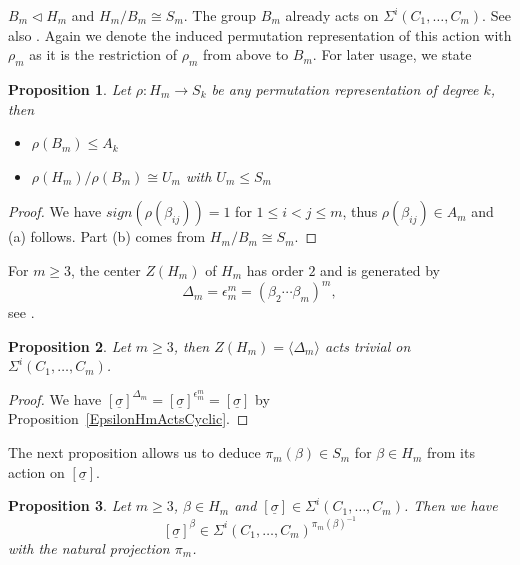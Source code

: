 \documentclass[12pt,a4paper]{article}
\newtheorem{proposition}{Proposition}[section]
\numberwithin{equation}{section}
\numberwithin{table}{section}
\begin{document}
$B_m \vartriangleleft H_m$ and $H_m/B_m \cong S_m$.
The group $B_m$ already acts on $\Sigma^i(C_1,\dots, C_m)$. See also \cite[III]{RefMM2018}.
Again we denote the induced permutation representation of this action with $\rho_m$ as
it is the restriction of $\rho_m$ from above to $B_m$.
For later usage, we state
%
\begin{proposition}
\label{PropertiesOfPermutationRepresentations}
Let $\rho : H_m \rightarrow S_k$ be any permutation representation of degree $k$, then
\begin{itemize}
\item[(a)]
$\rho(B_m) \leq A_k$
\item[(b)]
$\rho(H_m)/\rho(B_m) \cong U_m$ with $U_m \leq S_m$
\end{itemize}
\end{proposition}
\begin{proof}
We have $sign(\rho(\beta_{ij})) = 1$ for $1 \leq i < j \leq m$, thus $\rho(\beta_{ij}) \in A_m$ and (a) follows.
Part (b) comes from $H_m/B_m \cong S_m$.
\end{proof}
%
\noindent
For $m \geq 3$, the center $Z(H_m)$ of $H_m$ has order $2$ and is generated by 
$$\Delta_m = \epsilon_m^m = (\beta_2 \cdots \beta_m)^m,$$
see \cite[III, Corollary 1.8]{RefMM2018}.
%
\begin{proposition}
\label{CenterHmActsTrivial}
Let $m \geq 3$, then $Z(H_m) = \langle \Delta_m \rangle$ acts trivial on $\Sigma^i(C_1,\dots, C_m)$.
\end{proposition}
\begin{proof}
We have $[\underline{\sigma}]^{\Delta_m} = [\underline{\sigma}]^{\epsilon_m^m} = [\underline{\sigma}]$
by Proposition~\ref{EpsilonHmActsCyclic}.
\end{proof}
\noindent
The next proposition allows us to deduce $\pi_m(\beta) \in S_m$ for $\beta \in H_m$ from its action
on $[\underline{\sigma}]$.
\begin{proposition}
\label{DeducePiFromAction}
Let $m \geq 3$, $\beta \in H_m$ and $[\underline{\sigma}] \in \Sigma^i(C_1,\dots, C_m)$.
Then we have
$$[\underline{\sigma}]^{\beta} \in \Sigma^i(C_1,\dots, C_m)^{\pi_m(\beta)^{-1}}$$
with the natural projection $\pi_m$.
\end{proposition}
\end{document}
